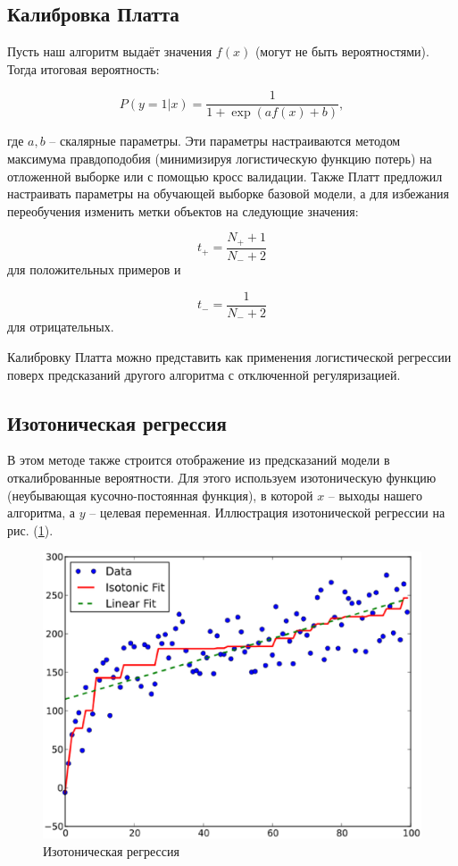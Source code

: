 \documentclass[12pt,a4paper]{article}
\begin{document}
\subsection{Калибровка Платта}

Пусть наш алгоритм выдаёт значения $f(x)$ (могут не быть вероятностями). Тогда итоговая вероятность:

$$P(y = 1 | x) = \frac{1}{1+\exp (af(x) + b)},$$

где $a, b$ -- скалярные параметры. Эти параметры настраиваются методом максимума правдоподобия (минимизируя логистическую функцию потерь) на отложенной выборке или с помощью кросс валидации. Также Платт предложил настраивать параметры на обучающей выборке базовой модели, а для избежания переобучения изменить метки объектов на следующие значения:

$$t_{+} = \frac{N_{+} + 1}{N_{-} + 2}$$ для положительных примеров и

$$t_{-} = \frac{1}{N_{-} + 2}$$ для отрицательных.

Калибровку Платта можно представить как применения логистической регрессии поверх предсказаний другого алгоритма с отключенной регуляризацией.


\subsection{Изотоническая регрессия}

В этом методе также строится отображение из предсказаний модели в откалиброванные вероятности. Для этого используем изотоническую функцию (неубывающая кусочно-постоянная функция), в которой $x$ -- выходы нашего алгоритма, а $y$ -- целевая переменная. Иллюстрация изотонической регрессии на рис. (\ref{fig:isotonic}).

\begin{center}
\begin{figure}[!htb]
 \centering
 \includegraphics[width=0.7\linewidth]{img/isotonic.eps}
 \caption{Изотоническая регрессия}\label{fig:isotonic}
\end{figure}
\end{center}
\end{document}
